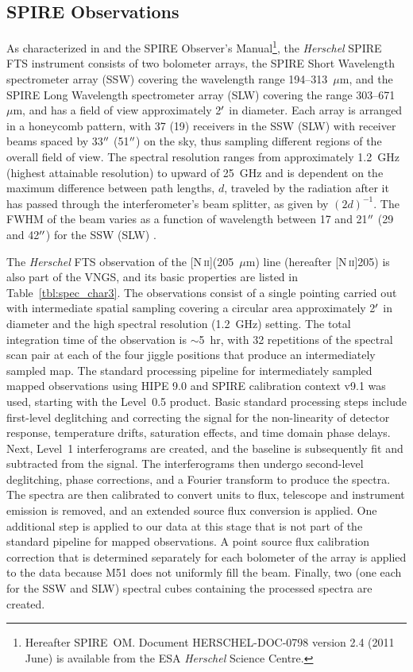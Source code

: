 \subsection{SPIRE Observations}\label{spire_obs}
As characterized in \citet{2010A&A...518L...3G} and the SPIRE Observer's Manual\footnote{Hereafter SPIRE~OM.  Document HERSCHEL-DOC-0798 version 2.4 (2011 June) is available from the ESA \emph{Herschel} Science Centre.}, the \emph{Herschel} SPIRE FTS instrument consists of two bolometer arrays, the SPIRE Short Wavelength spectrometer array (SSW) covering the wavelength range 194--313~$\mu$m, and the SPIRE Long Wavelength spectrometer array (SLW) covering the range 303--671~$\mu$m, and has a field of view approximately 2$\mbox{$^\prime$}$ in diameter.  Each array is arranged in a honeycomb pattern, with 37 (19) receivers in the SSW (SLW) with receiver beams spaced by 33$\mbox{$^{\prime\prime}$}$ (51$\mbox{$^{\prime\prime}$}$) on the sky, thus sampling different regions of the overall field of view. The spectral resolution ranges from approximately 1.2~GHz (highest attainable resolution) to upward of 25~GHz and is dependent on the maximum difference between path lengths, $d$, traveled by the radiation after it has passed through the interferometer's beam splitter, as given by $(2d)^{-1}$.  The FWHM of the beam varies as a function of wavelength between 17 and 21$\mbox{$^{\prime\prime}$}$ (29 and 42$\mbox{$^{\prime\prime}$}$) for the SSW (SLW) \citep{2010A&A...518L...3G,2010A&A...518L...4S}.

The \emph{Herschel} FTS observation of the [N\,\textsc{ii}](205~$\mu$m) line (hereafter [N\,\textsc{ii}]205) is also part of the VNGS, and its basic properties are listed in Table~\ref{tbl:spec_char3}.  The observations consist of a single pointing carried out with intermediate spatial sampling covering a circular area approximately 2$\mbox{$^\prime$}$ in diameter and the high spectral resolution (1.2~GHz) setting. The total integration time of the observation is $\sim$5~hr, with 32 repetitions of the spectral scan pair at each of the four jiggle positions that produce an intermediately sampled map.  The standard processing pipeline for intermediately sampled mapped observations using HIPE 9.0 and SPIRE calibration context v9.1 was used, starting with the Level~0.5 product.   Basic standard processing steps include first-level deglitching and correcting the signal for the non-linearity of detector response, temperature drifts, saturation effects, and time domain phase delays.  Next, Level~1 interferograms are created, and the baseline is subsequently fit and subtracted from the signal.  The interferograms then undergo second-level deglitching, phase corrections, and a Fourier transform to produce the spectra.  The spectra are then calibrated to convert units to flux, telescope and instrument emission is removed, and an extended source flux conversion is applied.  One additional step is applied to our data at this stage that is not part of the standard pipeline for mapped observations.  A point source flux calibration correction that is determined separately for each bolometer of the array is applied to the data because M51 does not uniformly fill the beam.  Finally, two (one each for the SSW and SLW) spectral cubes containing the processed spectra are created.

